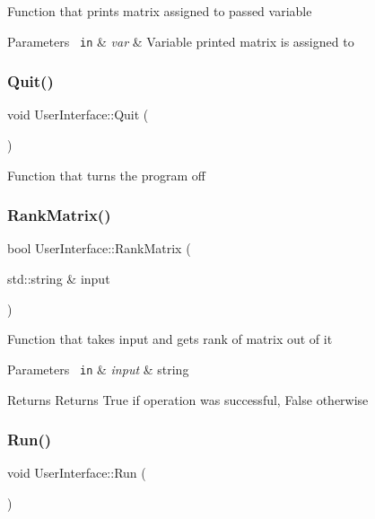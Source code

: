 Function that prints matrix assigned to passed variable 
\begin{DoxyParams}[1]{Parameters}
\mbox{\texttt{ in}}  & {\em var} & Variable printed matrix is assigned to \\
\hline
\end{DoxyParams}
\mbox{\label{class_user_interface_a1b3e14c742df39d1da1c9bcb67797afb}} 
\subsubsection{\texorpdfstring{Quit()}{Quit()}}
{\footnotesize\ttfamily void User\+Interface\+::\+Quit (\begin{DoxyParamCaption}{ }\end{DoxyParamCaption})}

Function that turns the program off \mbox{\label{class_user_interface_ad0bb8a04c4f0f719bbe132da5bcdb4cd}} 
\subsubsection{\texorpdfstring{RankMatrix()}{RankMatrix()}}
{\footnotesize\ttfamily bool User\+Interface\+::\+Rank\+Matrix (\begin{DoxyParamCaption}\item[{std\+::string \&}]{input }\end{DoxyParamCaption})}

Function that takes input and gets rank of matrix out of it 
\begin{DoxyParams}[1]{Parameters}
\mbox{\texttt{ in}}  & {\em input} & string \\
\hline
\end{DoxyParams}
\begin{DoxyReturn}{Returns}
Returns True if operation was successful, False otherwise 
\end{DoxyReturn}
\mbox{\label{class_user_interface_a63387b09d5225cfeb5c76582a6131b6c}} 
\subsubsection{\texorpdfstring{Run()}{Run()}}
{\footnotesize\ttfamily void User\+Interface\+::\+Run (\begin{DoxyParamCaption}{ }\end{DoxyParamCaption})}

